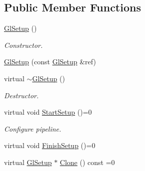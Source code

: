 \subsection*{Public Member Functions}
\begin{DoxyCompactItemize}
\item 
\mbox{\label{class_geometry_engine_1_1_geometry_gl_setup_1_1_gl_setup_afbcf7e1e763b54030ddb50d2cd94a8c8}} 
\mbox{\hyperlink{class_geometry_engine_1_1_geometry_gl_setup_1_1_gl_setup_afbcf7e1e763b54030ddb50d2cd94a8c8}{Gl\+Setup}} ()
\begin{DoxyCompactList}\small\item\em Constructor. \end{DoxyCompactList}\item 
\mbox{\hyperlink{class_geometry_engine_1_1_geometry_gl_setup_1_1_gl_setup_a2aeb6f3e7475c4021597de2fb0bd9060}{Gl\+Setup}} (const \mbox{\hyperlink{class_geometry_engine_1_1_geometry_gl_setup_1_1_gl_setup}{Gl\+Setup}} \&ref)
\item 
\mbox{\label{class_geometry_engine_1_1_geometry_gl_setup_1_1_gl_setup_ab8feeb944de8b6e4c8e6d7e09b49173c}} 
virtual \mbox{\hyperlink{class_geometry_engine_1_1_geometry_gl_setup_1_1_gl_setup_ab8feeb944de8b6e4c8e6d7e09b49173c}{$\sim$\+Gl\+Setup}} ()
\begin{DoxyCompactList}\small\item\em Destructor. \end{DoxyCompactList}\item 
\mbox{\label{class_geometry_engine_1_1_geometry_gl_setup_1_1_gl_setup_ac12987f600cbb14ae0aefa0f18b9e190}} 
virtual void \mbox{\hyperlink{class_geometry_engine_1_1_geometry_gl_setup_1_1_gl_setup_ac12987f600cbb14ae0aefa0f18b9e190}{Start\+Setup}} ()=0
\begin{DoxyCompactList}\small\item\em Configure pipeline. \end{DoxyCompactList}\item 
virtual void \mbox{\hyperlink{class_geometry_engine_1_1_geometry_gl_setup_1_1_gl_setup_a6233d780b8ba17d9fd26f2aef0df26aa}{Finish\+Setup}} ()=0
\item 
virtual \mbox{\hyperlink{class_geometry_engine_1_1_geometry_gl_setup_1_1_gl_setup}{Gl\+Setup}} $\ast$ \mbox{\hyperlink{class_geometry_engine_1_1_geometry_gl_setup_1_1_gl_setup_adf97b18fd8af32c63a189983ab35d5ae}{Clone}} () const =0

\end{DoxyCompactItemize}
